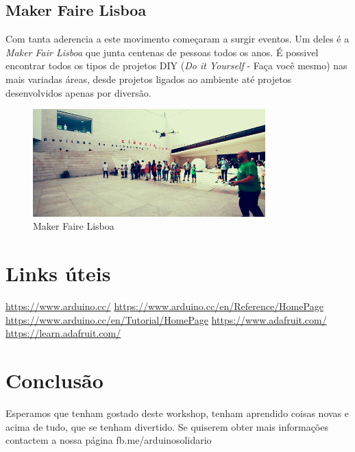 \documentclass{article}
\begin{document}
\subsection{Maker Faire Lisboa}
Com tanta aderencia a este movimento começaram a surgir eventos. Um deles é a \textit{Maker Fair Lisboa} que junta centenas de pessoas todos os anos. É possivel encontrar todos os tipos de projetos DIY (\textit{Do it Yourself} - Faça você mesmo) nas mais variadas áreas, desde projetos ligados ao ambiente até projetos desenvolvidos apenas por diversão.

\begin{figure}[h]
\centering
\includegraphics[width=0.8\textwidth]{img/mflisboa}
\caption{Maker Faire Lisboa}
\end{figure}

\section{Links úteis}
\url{https://www.arduino.cc/}\newline
\url{https://www.arduino.cc/en/Reference/HomePage}\newline
\url{https://www.arduino.cc/en/Tutorial/HomePage}\newline\newline
\url{https://www.adafruit.com/}\newline
\url{https://learn.adafruit.com/}\newline



\section{Conclusão}
Esperamos que tenham gostado deste workshop, tenham aprendido coisas novas e acima de tudo, que se tenham divertido.
Se quiserem obter mais informações contactem a nossa página fb.me/arduinosolidario
\end{document}
